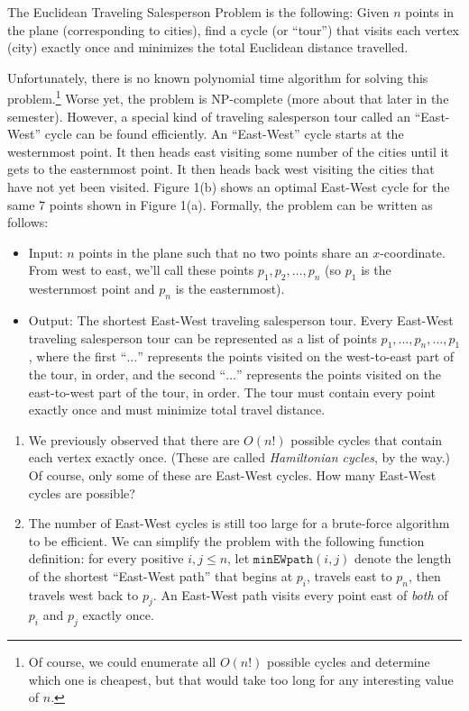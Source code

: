 \documentclass[12 pt, letterpaper]{hmcpset}
\begin{document}
\begin{problem}
	The Euclidean Traveling Salesperson Problem is the following:  Given $n$ points in the plane (corresponding to cities), find a cycle (or ``tour'') that visits each vertex (city) exactly once and minimizes the total Euclidean distance travelled.

	Unfortunately, there is no known polynomial time algorithm for solving this problem.\footnote{Of course, we could enumerate all $O(n!)$ possible cycles and determine which one is cheapest, but that would take too long for any interesting value of $n$.} Worse yet, the problem is NP-complete (more about that later in the semester). However, a special kind of traveling salesperson tour called an ``East-West'' cycle can be found efficiently.  An ``East-West'' cycle starts at the westernmost point.  It then heads east visiting some number of the cities until it gets to the easternmost point.  It then heads back west visiting the cities that have not yet been visited.  Figure 1(b) shows an optimal East-West cycle for the same 7 points shown in Figure 1(a). Formally, the problem can be written as follows:

\begin{itemize}
    \item {Input:} $n$ points in the plane such that no two points share an $x$-coordinate. From west to east, we'll call these points $p_1, p_2, \dots, p_n$ (so $p_1$ is the westernmost point and $p_n$ is the easternmost).
    \item {Output:} The shortest East-West traveling salesperson tour. Every East-West traveling salesperson tour can be represented as a list of points $p_1, \dots, p_n, \dots, p_1$, where the first ``$\dots$'' represents the points visited on the west-to-east part of the tour, in order, and the second ``$\dots$'' represents the points visited on the east-to-west part of the tour, in order. The tour must contain every point exactly once and must minimize total travel distance.
\end{itemize}

\begin{enumerate}
    \item We previously observed that there are $O(n!)$ possible cycles that contain each vertex exactly once. (These are called \emph{Hamiltonian cycles}, by the way.) Of course, only some of these are East-West cycles. How many East-West cycles are possible?
    
    \item The number of East-West cycles is still too large for a brute-force algorithm to be efficient. We can simplify the problem with the following function definition: for every positive $i, j \leq n$, let $\mathtt{minEWpath}(i, j)$ denote the length of the shortest ``East-West path'' that begins at $p_i$, travels east to $p_n$, then travels west back to $p_j$. An East-West path visits every point east of \emph{both} of $p_i$ and $p_j$ exactly once.


\end{enumerate}
\end{problem}
\end{document}
